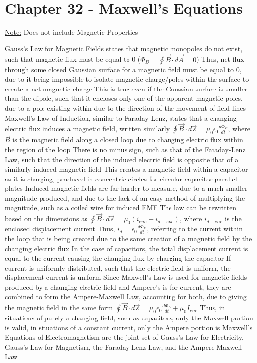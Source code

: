 \documentclass[11 pt, twoside]{article}
\newenvironment{outline*}
{
	\begin{outline}[enumerate]
	}
	{\end{outline}
}
\begin{document}
\section{Chapter 32 - Maxwell's Equations}
\underline{Note:} Does not include Magnetic Properties
\begin{outline*}
\1 Gauss's Law for Magnetic Fields states that magnetic monopoles do not exist, such that magnetic flux must be equal to 0 ($\Phi_B = \oint \vec{B} \cdot d\vec{A} = 0$)
\2 Thus, net flux through some closed Gaussian surface for a magnetic field must be equal to 0, due to it being impossible to isolate magnetic charge/poles within the surface to create a net magnetic charge
\2 This is true even if the Gaussian surface is smaller than the dipole, such that it encloses only one of the apparent magnetic poles, due to a pole existing within due to the direction of the movement of field lines
\1 Maxwell's Law of Induction, similar to Faraday-Lenz, states that a changing electric flux induces a magnetic field, written similarly
\2 $\oint \vec{B} \cdot d\vec{s} = \mu_0\epsilon_0 \frac{d\Phi_E}{dt}$, where $\vec{B}$ is the magnetic field along a closed loop due to changing electric flux within the region of the loop
\3 There is no minus sign, such as that of the Faraday-Lenz Law, such that the direction of the induced electric field is opposite that of a similarly induced magnetic field
\2 This creates a magnetic field within a capacitor as it is charging, produced in concentric circles for circular capacitor parallel plates
\3 Induced magnetic fields are far harder to measure, due to a much smaller magnitude produced, and due to the lack of an easy method of multiplying the magnitude, such as a coiled wire for induced EMF
\2 The law can be rewritten based on the dimensions as $\oint \vec{B} \cdot d\vec{s} = \mu_0(i_{enc} + i_{d-enc})$, where $i_{d-enc}$ is the enclosed displacement current
\3 Thus, $i_d = \epsilon_0 \frac{d\Phi_E}{dt}$, referring to the current within the loop that is being created due to the same creation of a magnetic field by the changing electric flux 
\3 In the case of capacitors, the total displacement current is equal to the current causing the changing flux by charging the capacitor
\4 If current is uniformly distributed, such that the electric field is uniform, the displacement current is uniform
\2 Since Maxwell's Law is used for magnetic fields produced by a changing electric field and Ampere's is for current, they are combined to form the Ampere-Maxwell Law, accounting for both, due to giving the magnetic field in the same form
\3 $\oint \vec{B} \cdot d\vec{s} = \mu_0\epsilon_0 \frac{d\Phi_E}{dt} + \mu_0I_{enc}$
\3 Thus, in situations of purely a changing field, such as capacitors, only the Maxwell portion is valid, in situations of a constant current, only the Ampere portion is
\1 Maxwell's Equations of Electromagnetism are the joint set of Gauss's Law for Electricity, Gauss's Law for Magnetism, the Faraday-Lenz Law, and the Ampere-Maxwell Law
\end{outline*}
\end{document}
